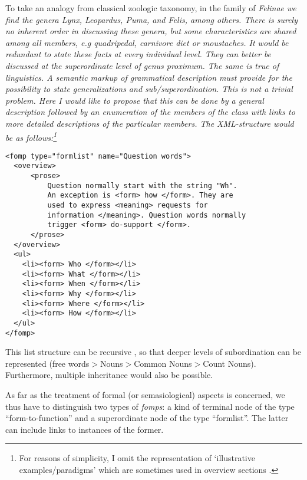 To take an analogy from classical zoologic taxonomy, in the family of \em Felinae \em  we find the genera \em Lynx, Leopardus, Puma, \em and \em Felis\em, among others. There is surely no inherent order in discussing these genera, but some characteristics are shared among all members, e.g quadripedal, carnivore diet or moustaches. It would be redundant to state these facts at every individual level. They can better be discussed at the superordinate level of \em genus proximum\em. The same is true of linguistics. A semantic markup of grammatical description must provide for the possibility to state generalizations and sub/superordination. This is not a trivial problem. Here I would like to propose that this can be done by a general description followed by an enumeration of the members of the class with links to more detailed descriptions of the particular members. The XML-structure would be as follows:\footnote{For 
 reasons of simplicity, I omit the representation of `illustrative examples/paradigms' which are sometimes used in overview sections \citep{Good2004}.
}

\ea\label{xml:formlist}
\begin{verbatim}
<fomp type="formlist" name="Question words">
  <overview>
      <prose>
          Question normally start with the string "Wh".
          An exception is <form> how </form>. They are
          used to express <meaning> requests for
          information </meaning>. Question words normally
          trigger <form> do-support </form>.
      </prose>
  </overview>
  <ul>
    <li><form> Who </form></li>
    <li><form> What </form></li>
    <li><form> When </form></li>
    <li><form> Why </form></li>
    <li><form> Where </form></li>
    <li><form> How </form></li>
  </ul>
</fomp>
\end{verbatim}
\z

This list structure can be recursive \citep{Good2004}, so that deeper levels of subordination can be represented (free words$>$Nouns$>$Common Nouns$>$Count Nouns). Furthermore, multiple inheritance would also be possible.

As far as the treatment of formal (or semasiological) aspects is concerned, we thus have to distinguish two types of \textit{fomps}: a kind of  terminal node of the type ``form-to-function'' and a superordinate node of the type ``formlist''. The latter can include links to instances of the former.

